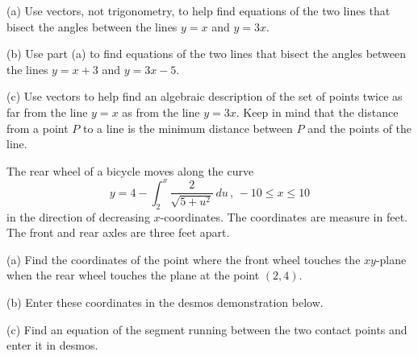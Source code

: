 \documentclass{ximera}
\begin{document}
\begin{question}   \label{Q6547:Vectors}
(a) Use vectors, not trigonometry, to help find equations of the two lines that bisect the angles between the lines $y=x$ and $y=3x$.

(b) Use part (a) to find equations of the two lines that bisect the angles between the lines $y=x+3$ and $y=3x-5$.


(c) Use vectors to help find an algebraic description of the set of points twice as far from the line $y=x$ as from the line $y=3x$. Keep in mind that the distance from a point $P$ to a line is the minimum distance between $P$ and the points of the line. 

\end{question}

\begin{question} \label{Q5704r:Vectors}
The rear wheel of a bicycle moves along the curve
\[
    y = 4 -\int_2^x \frac{2}{\sqrt{5+u^2}}\, du \, , \, -10 \leq x \leq 10 
\]
in the direction of decreasing $x$-coordinates. The coordinates are measure in feet. The front and rear axles are three feet apart.

(a) Find the coordinates of the point where the front wheel touches the $xy$-plane when the rear wheel touches the plane at the point $(2,4)$. 

(b) Enter these coordinates in the desmos demonstration below. 

(c) Find an equation of the segment running between the two contact points and enter it in desmos.

 
\begin{onlineOnly}
    \begin{center}
\end{center}
\end{onlineOnly}

\end{question}
\end{document}
